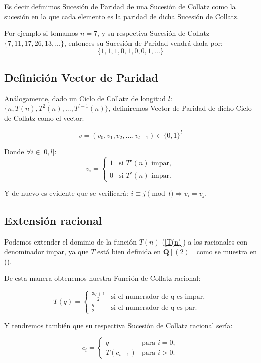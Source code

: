 Es decir definimos Sucesión de Paridad de una Sucesión de Collatz como la sucesión en la que cada elemento es la paridad de dicha Sucesión de Collatz.

Por ejemplo si tomamos $n=7$, y su respectiva Sucesión de Collatz $\{7, 11, 17, 26, 13, ... \}$, entonces su Sucesión de Paridad vendrá dada por:
$$\{ 1, 1, 1, 0, 1, 0, 0, 1,... \}$$


\subsection{Definición Vector de Paridad}
Análogamente, dado un Ciclo de Collatz de longitud $l$: $\{ n, T(n), T^2(n), ..., T^{l-1}(n)\}$, definiremos Vector de Paridad de dicho Ciclo de Collatz como el vector:

$$
    v=(v_0, v_1, v_2, ..., v_{l-1}) \in \{0,1\}^l
$$

Donde $\forall i \in [0,l[$:
$$
    v_i = \begin{cases}
    1 & \text{si $T^i(n)$ impar},\\
    0 & \text{si $T^i(n)$ impar}.
    \end{cases}
$$

Y de nuevo es evidente que se verificará:
$i \equiv j \pmod l \Longrightarrow v_i = v_j$. 


\subsection{Extensión racional}
Podemos extender el dominio de la función $T(n)$ (\ref{T(n)}) a los racionales con denominador impar, ya que $T$ está bien definida en $\mathbf{Q}[(2)]$ como se muestra en (\cite{Lagarias1990}).

De esta manera obtenemos nuestra Función de Collatz racional:

\begin{equation}
\label{T(q)}
    T(q) = \begin{cases}
    \frac{3q+1}{2} & \text{si el numerador de q es impar},\\
    \frac{q}{2} & \text{si el numerador de q es par}.
    \end{cases}
\end{equation}

Y tendremos también que su respectiva Sucesión de Collatz racional sería:

\begin{equation}
\label{SucesionCollatzRacional}
    c_i = \begin{cases}
    q & \text{para } i=0,\\
    T(c_{i-1}) & \text{para } i>0.
    \end{cases}
\end{equation}

